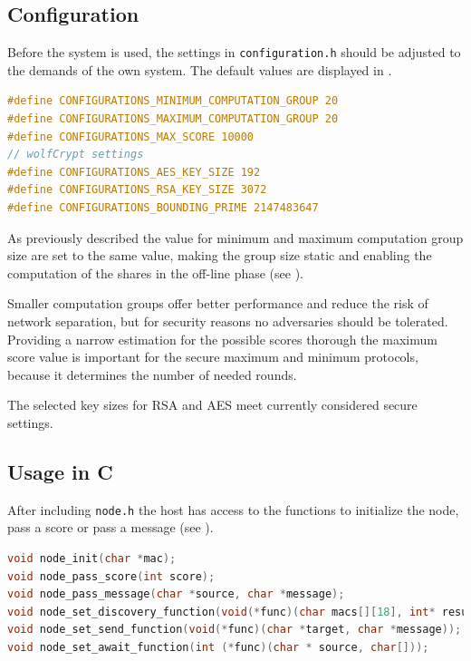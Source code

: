 \subsection{Configuration} \label{Configuration}

Before the system is used, the settings in \lstinline|configuration.h| should be adjusted to the demands of the own system. The default values are displayed in .

\begin{lstlisting}[language=C, caption={Definitions in configurations.h}, label={Definitions in configurations.h}, float, floatplacement=H]
#define CONFIGURATIONS_MINIMUM_COMPUTATION_GROUP 20
#define CONFIGURATIONS_MAXIMUM_COMPUTATION_GROUP 20
#define CONFIGURATIONS_MAX_SCORE 10000
// wolfCrypt settings
#define CONFIGURATIONS_AES_KEY_SIZE 192
#define CONFIGURATIONS_RSA_KEY_SIZE 3072
#define CONFIGURATIONS_BOUNDING_PRIME 2147483647
\end{lstlisting}

As previously described the value for minimum and maximum computation group size are set to the same value, making the group size static and enabling the computation of the shares in the off-line phase (see ). 

Smaller computation groups offer better performance and reduce the risk of network separation, but for security reasons no adversaries should be tolerated. Providing a narrow estimation for the possible scores thorough the maximum score value is important for the secure maximum and minimum protocols, because it determines the number of needed rounds.

The selected key sizes for \gls{RSA} and \gls{AES} meet currently considered secure settings.  

\subsection{Usage in C}	\label{Usage in C}

After including \lstinline|node.h| the host has access to the functions to initialize the node, pass a score or pass a message (see ). 

\begin{lstlisting}[language=C, caption={Function prototypes int node.h}, label={Function prototypes int node.h}, float, floatplacement=H]
void node_init(char *mac);
void node_pass_score(int score);
void node_pass_message(char *source, char *message);
void node_set_discovery_function(void(*func)(char macs[][18], int* result_count));
void node_set_send_function(void(*func)(char *target, char *message));
void node_set_await_function(int (*func)(char * source, char[]));
\end{lstlisting}

